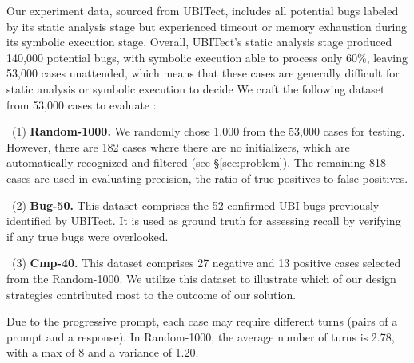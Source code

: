 
Our experiment data, sourced from UBITect, includes all potential bugs labeled by its static analysis stage but experienced timeout or memory exhaustion during its symbolic execution stage. 
Overall, UBITect's static analysis stage produced 140,000 potential bugs, with symbolic execution able to process only 60\%, leaving 53,000 cases unattended, which means that these cases are generally difficult for static analysis or symbolic execution to decide
We craft the following dataset from 53,000 cases to evaluate \work:



~\noindent(1) \textbf{Random-1000.} We randomly chose 1,000 from the 53,000 cases for testing. However, there are 182 cases where there are no initializers, which are automatically recognized and filtered (see \S\ref{sec:problem}). The remaining 818 cases are used in evaluating precision, \ie the ratio of true positives to false positives. 

~\noindent(2) \textbf{Bug-50.} This dataset comprises the 52 confirmed UBI bugs previously identified by UBITect. It is used as ground truth for assessing recall by verifying if any true bugs were overlooked.

~\noindent(3) \textbf{Cmp-40.} This dataset comprises 27 negative and 13 positive cases selected from the Random-1000. We utilize this dataset to illustrate which of our design strategies contributed most to the outcome of our solution.



Due to the progressive prompt, each case may require different turns (pairs of a prompt and a response). In Random-1000, the average number of turns is 2.78, with a max of 8 and a variance of 1.20. 



